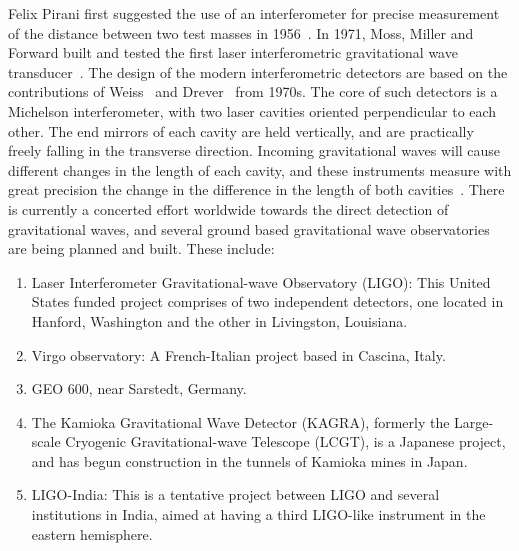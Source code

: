 
Felix Pirani first suggested the use of an interferometer for precise
measurement of the distance between two test masses in 1956~\cite{Pirani:1956}.
In 1971, Moss, Miller and Forward built and tested the first laser
interferometric gravitational wave transducer~\cite{Forward:1971}. The design
of the modern interferometric detectors are based on the contributions 
of Weiss~\cite{Weiss:1972} and Drever~\cite{Drever:1980} from 1970s. The
core of such detectors is a Michelson interferometer, with two laser 
cavities oriented perpendicular to each other. The end mirrors of each 
cavity are held vertically, and are practically freely falling in the 
transverse direction. Incoming gravitational waves will cause different 
changes in the length of each cavity, and these instruments measure with 
great precision the change in the difference in the length of both 
cavities~\cite{Saulson:1995zi}. 
%
There is currently a concerted effort worldwide towards the direct detection 
of gravitational waves, and several ground based gravitational wave observatories 
are being planned and built. These include:
%
\begin{enumerate}
 \item Laser Interferometer Gravitational-wave Observatory (LIGO): This
 United States funded project comprises of two independent detectors, one 
 located in Hanford, Washington and the other in Livingston, Louisiana. 
 \item Virgo observatory: A French-Italian project based in Cascina, Italy.
 \item GEO 600, near Sarstedt, Germany.
 \item The Kamioka Gravitational Wave Detector (KAGRA), formerly the Large-scale
 Cryogenic Gravitational-wave Telescope (LCGT), is a Japanese project, and has
 begun construction in the tunnels of Kamioka mines in Japan.  
 \item LIGO-India: This is a tentative project between LIGO and several 
 institutions in India, aimed at having a third LIGO-like instrument in the 
 eastern hemisphere.
\end{enumerate}
% 
